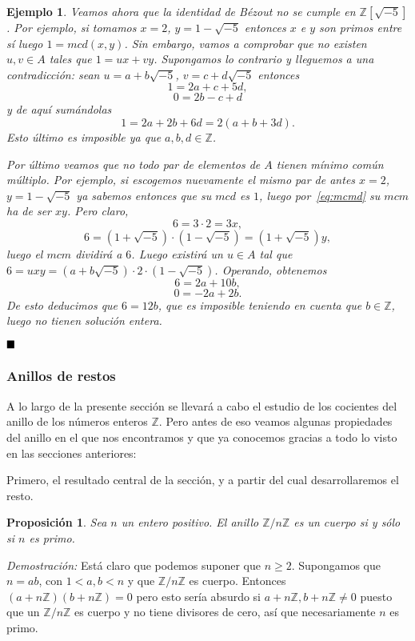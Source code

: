 \documentclass[12pt]{article}
\newtheorem{proposition}[theorem]{Proposición}
\newtheorem{example}{Ejemplo}[theorem]
\begin{document}
\begin{example}
Veamos ahora que la identidad de Bézout no se cumple en $\mathbb{Z}[\sqrt{-5}]$. Por ejemplo, si tomamos $x = 2$, $y = 1-\sqrt{-5}$ entonces $x$ e $y$ son primos entre sí luego $1 = mcd(x,y)$. Sin embargo, vamos a comprobar que no existen $u,v \in A$ tales que $1 = ux + vy$. Supongamos lo contrario y lleguemos a una contradicción: sean $u = a+b\sqrt{-5}$, $v = c + d\sqrt{-5}$ entonces $$1 = 2a + c+ 5d,$$ $$0 = 2b - c + d$$ y de aquí sumándolas $$1 = 2a + 2b + 6d = 2(a + b + 3d).$$ Esto último es imposible ya que $a,b,d \in \mathbb{Z}$.

Por último veamos que no todo par de elementos de $A$ tienen mínimo común múltiplo. Por ejemplo, si escogemos nuevamente el mismo par de antes $x = 2$, $y = 1- \sqrt{-5}$ ya sabemos entonces que su $mcd$ es $1$, luego por~\ref{eq:mcmd} su $mcm$ ha de ser $xy$. Pero claro, $$6 = 3 \cdot 2 = 3x, $$ $$6 = (1 + \sqrt{-5}) \cdot (1 - \sqrt{-5}) = (1 + \sqrt{-5})y,$$ luego el $mcm$ dividirá a $6$. Luego existirá un $u \in A$ tal que $6 = uxy = (a+ b\sqrt{-5}) \cdot 2 \cdot (1- \sqrt{-5})$. Operando, obtenemos $$6 = 2a + 10b,$$ $$0 = -2a + 2b.$$ De esto deducimos que $6 = 12b$, que es imposible teniendo en cuenta que $b \in \mathbb{Z}$, luego no tienen solución entera.

\end{example}
$\hfill \blacksquare$

\subsubsection{Anillos de restos}

A lo largo de la presente sección se llevará a cabo el estudio de los cocientes del anillo de los números enteros $\mathbb{Z}$. Pero antes de eso veamos algunas propiedades del anillo en el que nos encontramos y que ya conocemos gracias a todo lo visto en las secciones anteriores: 

Primero, el resultado central de la sección, y a partir del cual desarrollaremos el resto.

\begin{proposition}Sea $n$ un entero positivo. El anillo $\mathbb{Z}/n\mathbb{Z}$ es un cuerpo si y sólo si $n$ es primo.
\end{proposition}
\emph{Demostración: }Está claro que podemos suponer que $n \geq 2$. Supongamos que $n=ab$, con $1 <a,b<n$ y que $\mathbb{Z}/n\mathbb{Z}$ es cuerpo. Entonces $(a+n\mathbb{Z})(b+n\mathbb{Z}) = 0$ pero esto sería absurdo si $a+n\mathbb{Z},b+n\mathbb{Z}\neq 0$ puesto que un $\mathbb{Z}/n\mathbb{Z}$ es cuerpo y no tiene divisores de cero, así que necesariamente $n$ es primo.
\end{document}
